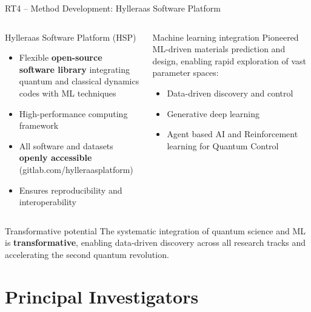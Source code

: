 \documentclass[aspectratio=169,10pt]{beamer}
\begin{document}
\begin{frame}{RT4 -- Method Development: Hylleraas Software Platform}
  \begin{columns}[T]
      \begin{block}{Hylleraas Software Platform (HSP)}
        \begin{itemize}
          \item Flexible \textbf{open-source software library}
                integrating quantum and classical dynamics codes
                with ML techniques
          \item High-performance computing framework
          \item All software and datasets \textbf{openly accessible}
                {\small(gitlab.com/hylleraasplatform)}
          \item Ensures reproducibility and interoperability
        \end{itemize}
      \end{block}
      \begin{block}{Machine learning integration}
        Pioneered ML-driven materials prediction and design,
        enabling rapid exploration of vast parameter spaces:
        \begin{itemize}
          \item Data-driven discovery and control
          \item Generative deep learning
          \item Agent based AI and Reinforcement learning for Quantum Control
        \end{itemize}
      \end{block}
  \end{columns}
  \vspace{3pt}
  \begin{alertblock}{Transformative potential}
    The systematic integration of quantum science and ML is
    \textbf{transformative}, enabling data-driven discovery across
    all research tracks and accelerating the second quantum revolution.
  \end{alertblock}
\end{frame}

\section{Principal Investigators}
\end{document}
